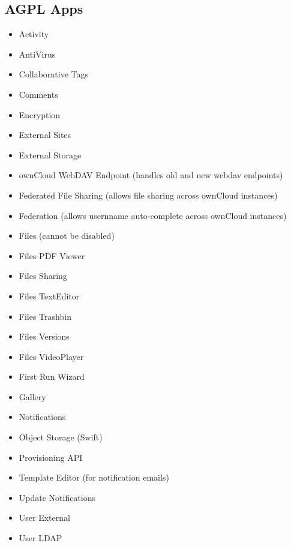 \documentclass[letterpaper,10pt,english]{sphinxmanual}
\begin{document}
\subsection{AGPL Apps}
\label{installation/apps_supported:agpl-apps}\begin{itemize}
\item {} 
Activity

\item {} 
AntiVirus

\item {} 
Collaborative Tags

\item {} 
Comments

\item {} 
Encryption

\item {} 
External Sites

\item {} 
External Storage

\item {} 
ownCloud WebDAV Endpoint (handles old and new webdav endpoints)

\item {} 
Federated File Sharing (allows file sharing across ownCloud instances)

\item {} 
Federation (allows usernname auto-complete across ownCloud instances)

\item {} 
Files (cannot be disabled)

\item {} 
Files PDF Viewer

\item {} 
Files Sharing

\item {} 
Files TextEditor

\item {} 
Files Trashbin

\item {} 
Files Versions

\item {} 
Files VideoPlayer

\item {} 
First Run Wizard

\item {} 
Gallery

\item {} 
Notifications

\item {} 
Object Storage (Swift)

\item {} 
Provisioning API

\item {} 
Template Editor (for notification emails)

\item {} 
Update Notifications

\item {} 
User External

\item {} 
User LDAP

\end{itemize}
\end{document}
